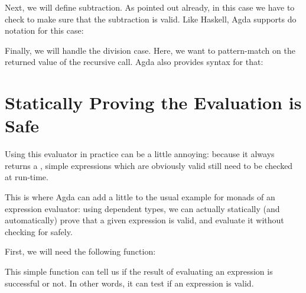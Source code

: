 Next, we will define subtraction.
As pointed out already, in this case we have to check to make sure that the
subtraction is valid.
Like Haskell, Agda supports do notation for this case:
\begin{agdalisting}
\end{agdalisting}

Finally, we will handle the division case.
Here, we want to pattern-match on the returned value of the recursive call.
Agda also provides syntax for that:
\begin{agdalisting}
\end{agdalisting}
\section{Statically Proving the Evaluation is Safe}
Using this evaluator in practice can be a little annoying:
because it always returns a , simple expressions which are
obviously valid still need to be checked at run-time.
\begin{agdalisting}
\end{agdalisting}
This is where Agda can add a little to the usual example for monads of an
expression evaluator: using dependent types, we can actually statically (and
automatically) prove that a given expression is valid, and evaluate it without
checking for  safely.

First, we will need the following function:
\begin{agdalisting}
\end{agdalisting}
This simple function can tell us if the result of evaluating an expression is
successful or not.
In other words, it can test if an expression is valid.

